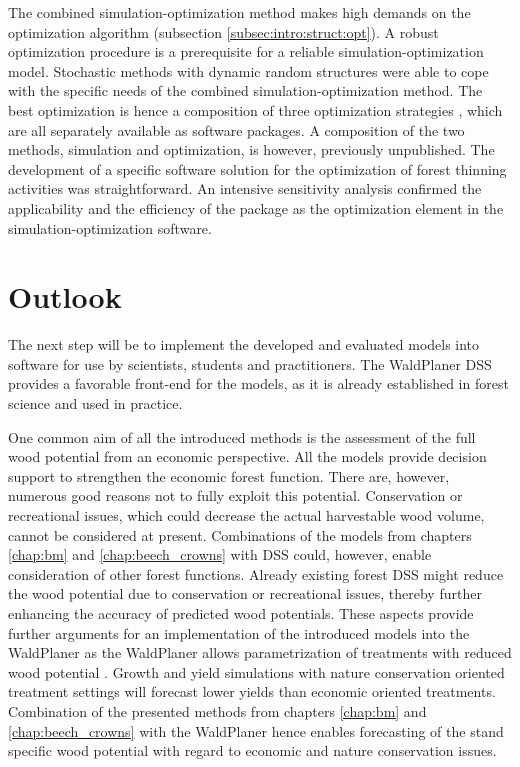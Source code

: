 The combined si\-mu\-la\-tion-op\-ti\-mi\-za\-tion method makes high demands on the optimization algorithm (subsection \ref{subsec:intro:struct:opt}). A robust optimization procedure is a prerequisite for a reliable si\-mu\-la\-tion-op\-ti\-mi\-za\-tion model. Stochastic methods with dynamic random structures were able to cope with the specific needs of the combined si\-mu\-la\-tion-op\-ti\-mi\-za\-tion method. The best optimization is hence a composition of three optimization strategies \citep{corana_1987, kirkpatrick_1983, pronzato_1984}, which are all separately available as software packages. A composition of the two methods, simulation and optimization, is however, previously unpublished. The development of a specific software solution for the optimization of forest thinning activities was straightforward. An intensive sensitivity analysis confirmed the applicability and the efficiency of the package as the optimization element in the si\-mu\-la\-tion-op\-ti\-mi\-za\-tion software.



\section{Outlook}
\label{sec:discussion:outlook}
The next step will be to implement the developed and evaluated models into software for use by scientists, students and practitioners. The WaldPlaner DSS provides a favorable front-end for the models, as it is already established in forest science and used in practice.

One common aim of all the introduced methods is the assessment of the full wood potential from an economic perspective. All the models provide decision support to strengthen the economic forest function. There are, however, numerous good reasons not to fully exploit this potential. Conservation or recreational issues, which could decrease the actual harvestable wood volume, cannot be considered at present. Combinations of the models from chapters \ref{chap:bm} and \ref{chap:beech_crowns} with DSS could, however, enable consideration of other forest functions. Already existing forest DSS might reduce the wood potential due to conservation or recreational issues, thereby further enhancing the accuracy of predicted wood potentials. These aspects provide further arguments for an implementation of the introduced models into the WaldPlaner as the WaldPlaner allows parametrization of treatments with reduced wood potential \citep[p. 90-93]{hansen_2014}. Growth and yield simulations with nature conservation oriented treatment settings will forecast lower yields than economic oriented treatments. Combination of the presented methods from chapters \ref{chap:bm} and \ref{chap:beech_crowns} with the WaldPlaner hence enables forecasting of the stand specific wood potential with regard to economic and nature conservation issues.

